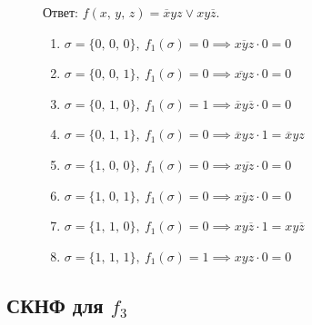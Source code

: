 \documentclass[12pt,a4paper]{article}
\theoremstyle{plain}
\theoremstyle{definition}
\theoremstyle{remark}
\numberwithin{equation}{section}
\begin{document}
\begin{figure}[H]
\begin{minipage}[t]{0.55\linewidth}
    \vspace{0.5em}
    \noindent Ответ: $f(x,\,y,\,z) = \overline{x}yz \lor xy\overline{z}$.
  \end{minipage} \hfill
  \begin{minipage}[t]{0.46\linewidth}
    \vspace{0em}
    \begin{enumerate}
      \item $\sigma = \{0,\,0,\,0\},\ f_1(\sigma) = 0 \implies \overline{xyz} \cdot 0 = 0$
      \item $\sigma = \{0,\,0,\,1\},\ f_1(\sigma) = 0 \implies \overline{xy}z \cdot 0 = 0$
      \item $\sigma = \{0,\,1,\,0\},\ f_1(\sigma) = 1 \implies \overline{x}y\overline{z} \cdot 0 = 0$
      \item $\sigma = \{0,\,1,\,1\},\ f_1(\sigma) = 0 \implies \overline{x}yz \cdot 1 = \overline{x}yz$
      \item $\sigma = \{1,\,0,\,0\},\ f_1(\sigma) = 0 \implies x\overline{yz} \cdot 0 = 0$
      \item $\sigma = \{1,\,0,\,1\},\ f_1(\sigma) = 0 \implies x\overline{y}z \cdot 0 = 0$
      \item $\sigma = \{1,\,1,\,0\},\ f_1(\sigma) = 0 \implies xy\overline{z} \cdot 1 = xy\overline{z}$
      \item $\sigma = \{1,\,1,\,1\},\ f_1(\sigma) = 1 \implies xyz \cdot 0 = 0$
    \end{enumerate}
  \end{minipage}
\end{figure}

\subsection{СКНФ для $f_3$}
\end{document}
